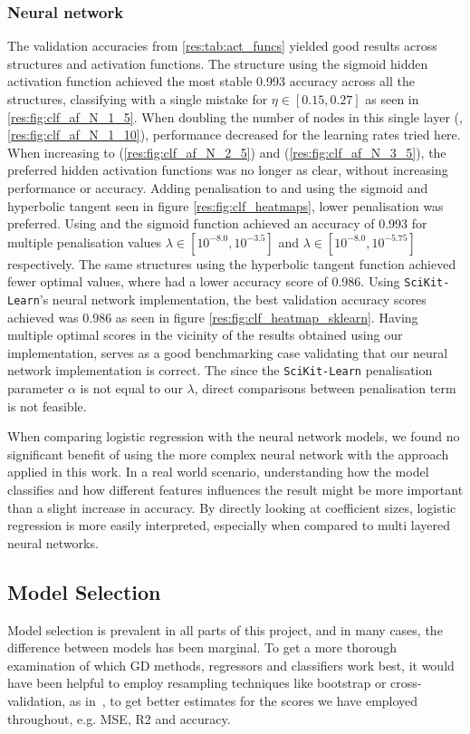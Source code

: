     \subsubsection{Neural network}
        The validation accuracies from \cref{res:tab:act_funcs} yielded good results across structures and activation functions. The  structure using the sigmoid hidden activation function achieved the most stable 0.993 accuracy across all the structures, classifying with a single mistake for $\eta \in [0.15, 0.27]$ as seen in \cref{res:fig:clf_af_N_1_5}. When doubling the number of nodes in this single layer (, \cref{res:fig:clf_af_N_1_10}), performance decreased for the learning rates tried here. When increasing to  (\cref{res:fig:clf_af_N_2_5}) and  (\cref{res:fig:clf_af_N_3_5}), the preferred hidden activation functions was no longer as clear, without increasing performance or accuracy. Adding penalisation to  and  using the sigmoid and hyperbolic tangent seen in figure \cref{res:fig:clf_heatmaps}, lower penalisation was preferred. Using  and  the sigmoid function achieved an accuracy of 0.993 for multiple penalisation values  $\lambda \in [10^{-8.0}, 10^{-3.5}]$ and $\lambda \in [10^{-8.0}, 10^{-5.75}]$ respectively. The same structures using the hyperbolic tangent function achieved fewer optimal values, where  had a lower accuracy score of 0.986. Using \verb|SciKit-Learn|'s neural network implementation, the best validation accuracy scores achieved was 0.986 as seen in figure \cref{res:fig:clf_heatmap_sklearn}. Having multiple optimal scores in the vicinity of the results obtained using our implementation, serves as a good benchmarking case validating that our neural network implementation is correct. The since the \verb|SciKit-Learn| penalisation parameter $\alpha$ is not equal to our $\lambda$, direct comparisons between penalisation term is not feasible.


        When comparing logistic regression with the neural network models, we found no significant benefit of using the more complex neural network with the approach applied in this work. In a real world scenario, understanding how the model classifies and how different features influences the result might be more important than a slight increase in accuracy. By directly looking at coefficient sizes, logistic regression is more easily interpreted, especially when compared to multi layered neural networks.  
        
        
\subsection{Model Selection}
    Model selection is prevalent in all parts of this project, and in many cases, the difference between models has been marginal. To get a more thorough examination of which GD methods, regressors and classifiers work best, it would have been helpful to employ resampling techniques like bootstrap or cross-validation, as in~\citep{Project1}, to get better estimates for the scores we have employed throughout, e.g. MSE, R2 and accuracy.